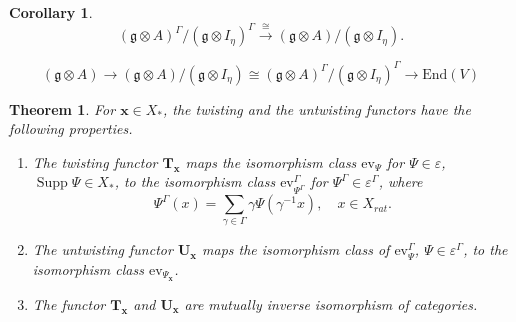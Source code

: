 \documentclass[10pt,a4paper]{amsart}
\newtheorem{cor}{Corollary}
\newtheorem{thm}{Theorem}
\DeclareMathOperator{\Supp}{Supp}
\newcommand{\g}{\mathfrak{g}}
\begin{document}
\begin{cor}\label{cor:9.8}
    \begin{equation*}
        (\g\otimes A)^{\Gamma}/(\g\otimes I_{\eta})^{\Gamma}\xrightarrow{\cong}(\g\otimes A)/(\g\otimes I_{\eta}).
    \end{equation*}
\end{cor}

\begin{equation}\label{eq:5}
    (\g\otimes A)\rightarrow(\g\otimes A)/(\g\otimes I_{\eta})\cong(\g\otimes A)^{\Gamma}/(\g\otimes I_{\eta})^{\Gamma}\rightarrow\mbox{End}(V)
\end{equation}

\begin{thm}\label{thm:3}
    For $\mathbf{x}\in X_{*}$, the twisting and the untwisting functors have the following properties.
    \begin{enumerate}[label=(\alph*)]
        \item The twisting functor $\textbf{T}_{\mathbf{x}}$ maps the isomorphism class $\mbox{ev}_{\Psi}$ for $\Psi\in\varepsilon$, $\Supp\Psi\in X_{*}$, to the isomorphism class $\mbox{ev}^{\Gamma}_{\Psi^{\Gamma}}$ for  $\Psi^{\Gamma}\in\varepsilon^{\Gamma}$, where
        \begin{equation*}
            \Psi^{\Gamma}(x)=\sum_{\gamma\in\Gamma}\gamma \Psi(\gamma^{-1}x),\quad x\in X_{rat}.
        \end{equation*}
        \item The untwisting functor $\textbf{U}_{\mathbf{x}}$ maps the isomorphism class of $\mbox{ev}^{\Gamma}_{\Psi}$, $\Psi\in\varepsilon^{\Gamma}$, to the isomorphism class $\mbox{ev}_{\Psi_{\mathbf{x}}}$.
        \item The functor $\textbf{T}_{\mathbf{x}}$ and $\textbf{U}_{\mathbf{x}}$ are mutually inverse isomorphism of categories.
    \end{enumerate}
\end{thm}
\end{document}
